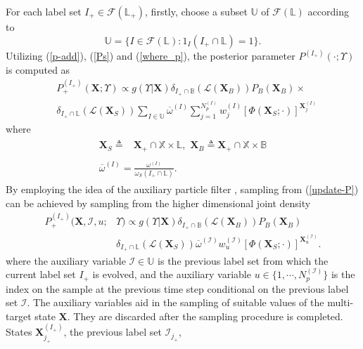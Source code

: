 \documentclass[journal]{IEEEtran}
\newcommand{\bX}{{\mathbf X}}
\begin{document}
{For each label set $I_{+}\in\mathcal{F}(\mathbb{L}_{+})$,  firstly, choose a subset $\mathbb{U}$ of  $\mathcal{F}(\mathbb{L})$ according to  $$\mathbb{U}=\{I\in\mathcal{F}(\mathbb{L}): 1_{I}(I_{+}\cap\mathbb{L})=1\}.$$
Utilizing (\ref{p-add}), (\ref{Ps}) and (\ref{where_p}), the posterior parameter $P^{(I_{+})}(\cdot;\Upsilon)$ is computed as
\begin{equation}\label{update-P}
\begin{split}
\!\!\!&P_{+}^{(I_{+})}(\bX;\Upsilon)
\propto g(\Upsilon|\bX)\delta_{I_{+}\cap\mathbb{B}}(\mathcal{L}(\bX_{B})
)P_B(\bX_{B})\times\\
&\delta_{I_{+}\cap\mathbb{L}}(
\mathcal{L}(\bX_{S})){\sum}_{I\in\mathbb{U}}\overline\omega^{(I)}{\sum}_{j=1}^{N_p^{(I)}} w_{j}^{(I)}[\Phi(\bX_S;\cdot)]^{\bX^{(I)}_j}
\end{split}
\end{equation}
where
\begin{align}
\begin{split}
 \bX_S\triangleq&\bX_+\cap\mathbb{X}\times\mathbb{L},\,\,
\bX_B\triangleq\bX_+\cap\mathbb{X}\times\mathbb{B}
\end{split}\\
\begin{split}
\overline \omega^{(I)}=\frac{\omega^{(I)}}{\omega_{S}(I_{+}\cap\mathbb{L})}.
\end{split}
\end{align}
By employing the idea of the auxiliary particle filter \cite{refr:tbd-2,refr:tbd-3,refr:tbd-4}, sampling from (\ref{update-P}) can be achieved by sampling from the higher dimensional joint density
\begin{equation}
\begin{split}
P_{+}^{(I_{+})}(\bX, \mathcal{I},u;&\Upsilon)\!\propto  g(\Upsilon|\bX)\delta_{I_{+}\cap\mathbb{B}}(\mathcal{L}(\bX_{B})
)P_B(\bX_{B})\\
&\delta_{I_{+}\cap\mathbb{L}}(
\mathcal{L}(\bX_{S})) \overline\omega^{(\mathcal{I})} w_{u}^{(\mathcal{I})}[\Phi(\bX_S;\cdot)]^{\bX^{(\mathcal{I})}_u}.
\end{split}
\end{equation}
where the auxiliary variable $\mathcal{I}\in\mathbb{U}$ is the previous label set from which the current label set $I_{+}$ is evolved, and  the auxiliary variable $u\in\{1,\cdots,N_p^{(\mathcal{I})}\}$ is the index on the sample at the previous time step conditional on the previous label set $\mathcal{I}$.
The auxiliary variables aid in the sampling of suitable values of the multi-target state $\bX$. They are discarded after the sampling procedure is completed. States $\bX_{j_{+}}^{(I_{+})}$, the previous label set $\mathcal{I}_{j_{+}}$,
}
\end{document}
